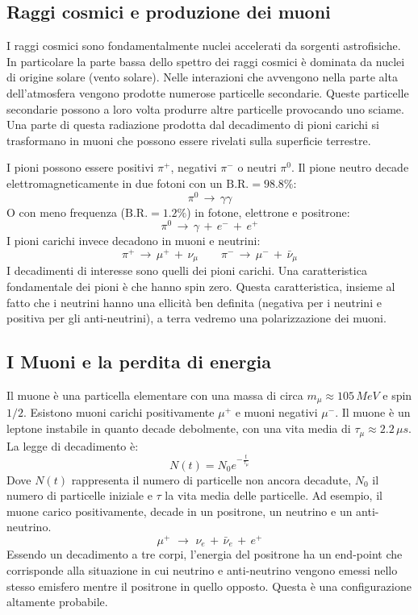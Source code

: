 \subsection{Raggi cosmici e produzione dei muoni}
I raggi cosmici sono fondamentalmente nuclei accelerati da sorgenti astrofisiche. In particolare la parte bassa dello spettro dei raggi cosmici è dominata da nuclei di origine solare (vento solare). Nelle interazioni che avvengono nella parte alta dell'atmosfera vengono prodotte numerose particelle secondarie. Queste particelle secondarie possono a loro volta produrre altre particelle provocando uno sciame. Una parte di questa radiazione prodotta dal decadimento di pioni carichi si trasformano in muoni che possono essere rivelati sulla superficie terrestre.

I pioni possono essere positivi $\pi^+$, negativi $\pi^-$ o neutri $\pi^0$. Il pione neutro decade elettromagneticamente in due fotoni con un $\text{B.R.}=98.8\%$:
\begin{equation}
    \pi^0\,\to\,\gamma\gamma
\end{equation}
O con meno frequenza ($\text{B.R.}=1.2\%$) in fotone, elettrone e positrone:
\begin{equation}
    \pi^0\,\to\,\gamma\,+\,e^-\,+\,e^+
\end{equation}
I pioni carichi invece decadono in muoni e neutrini:
\begin{equation}
    \pi^+\,\to\,\mu^+\,+\,\nu_\mu \qquad \pi^-\,\to\,\mu^-\,+\,\bar{\nu}_\mu
\end{equation}
I decadimenti di interesse sono quelli dei pioni carichi. Una caratteristica fondamentale dei pioni è che hanno spin zero. Questa caratteristica, insieme al fatto che i neutrini hanno una ellicità ben definita (negativa per i neutrini e positiva per gli anti-neutrini),  a terra vedremo una polarizzazione dei muoni.
\subsection{I Muoni e la perdita di energia}
Il muone è una particella elementare con una massa di circa $m_\mu\approx105\,\unit{MeV}$ e spin $1/2$. Esistono muoni carichi positivamente $\mu^+$ e muoni negativi $\mu^-$. Il muone è un leptone instabile in quanto decade debolmente,  con una vita media di $\tau_\mu\approx2.2\,\mu s$. 
La legge di decadimento è:
\begin{equation}
    N(t)=N_0e^{-\frac{t}{\tau_\mu}}
\end{equation}
Dove $N(t)$ rappresenta il numero di particelle non ancora decadute, $N_0$ il numero di particelle iniziale e $\tau$ la vita media delle particelle.
Ad esempio, il muone carico positivamente, decade in un positrone, un neutrino e un anti-neutrino.
\begin{equation}
    \mu^+\,\,\to\,\,\nu_{e}\,+\,\bar{\nu}_e\,+\,e^+
\end{equation}
Essendo un decadimento a tre corpi, l'energia del positrone ha un end-point che corrisponde alla situazione in cui neutrino e anti-neutrino vengono emessi nello stesso emisfero mentre il positrone in quello opposto. Questa è una configurazione altamente probabile.

